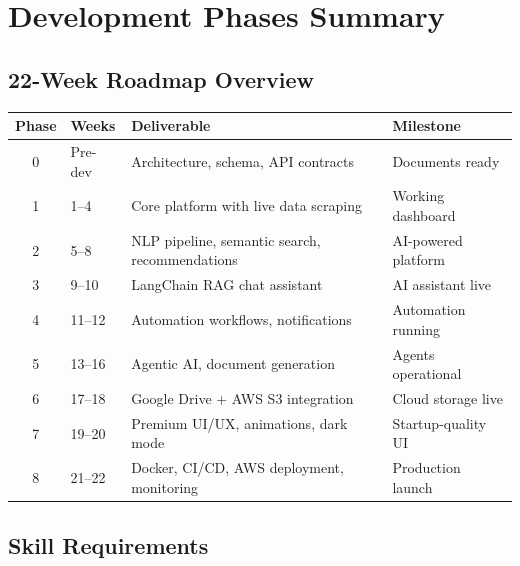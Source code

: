 \documentclass[12pt,a4paper]{report}
\begin{document}
\chapter{Development Phases Summary}

\section{22-Week Roadmap Overview}

\begin{center}
\begin{tabular}{clp{5cm}l}
\toprule
\textbf{Phase} & \textbf{Weeks} & \textbf{Deliverable} & \textbf{Milestone} \\
\midrule
0 & Pre-dev  & Architecture, schema, API contracts & Documents ready \\
1 & 1--4     & Core platform with live data scraping & Working dashboard \\
2 & 5--8     & NLP pipeline, semantic search, recommendations & AI-powered platform \\
3 & 9--10    & LangChain RAG chat assistant & AI assistant live \\
4 & 11--12   & Automation workflows, notifications & Automation running \\
5 & 13--16   & Agentic AI, document generation & Agents operational \\
6 & 17--18   & Google Drive + AWS S3 integration & Cloud storage live \\
7 & 19--20   & Premium UI/UX, animations, dark mode & Startup-quality UI \\
8 & 21--22   & Docker, CI/CD, AWS deployment, monitoring & Production launch \\
\bottomrule
\end{tabular}
\end{center}

\section{Skill Requirements}
\end{document}
